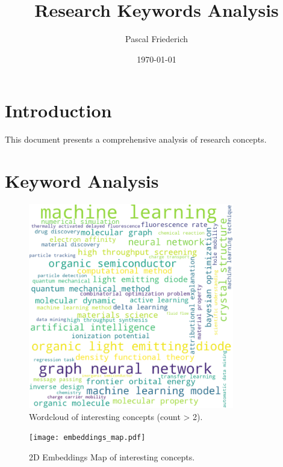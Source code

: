 \documentclass{article}%
\title{Research Keywords Analysis}%
\author{Pascal Friederich}%
\date{\today}%
\begin{document}
%
\normalsize%
\maketitle%
\section{Introduction}%
\label{sec:Introduction}%
This document presents a comprehensive analysis of research concepts.

%
\section{Keyword Analysis}%
\label{sec:KeywordAnalysis}%


\begin{figure}[H]%
\centering%
\includegraphics[width=0.8\textwidth]{wordcloud.png}%
\caption{Wordcloud of interesting concepts (count > 2).}%
\end{figure}

%


\begin{figure}[H]%
\centering%
\texttt{[image: embeddings\_map.pdf]}%
\caption{2D Embeddings Map of interesting concepts.}%
\end{figure}
\end{document}

